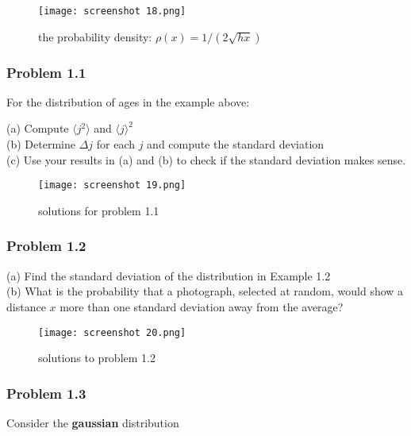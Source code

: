 \documentclass[svgnames]{article}   	%
\begin{document}
\begin{figure}[htb!]
  \centering
    \texttt{[image: screenshot 18.png]}
    \caption{the probability density: $\rho(x) = 1/(2\sqrt{hx})$}
\end{figure}


\subsubsection{Problem 1.1} For the distribution of ages in the example above: 

\begin{tcolorbox}	
  
  (a) Compute $\langle j^2 \rangle$ and $\langle j \rangle^2$ \\
  (b) Determine $\Delta j$ for each $j$ and compute the standard deviation\\
  (c) Use your results in (a) and (b) to check if the standard deviation makes sense. 
  
\end{tcolorbox}	


\begin{figure}[htb!]
  \centering
    \texttt{[image: screenshot 19.png]}
    \caption{solutions for problem 1.1}
\end{figure}


\subsubsection{Problem 1.2} 

\begin{tcolorbox}	
  
(a) Find the standard deviation of the distribution in Example 1.2\\
(b) What is the probability that a photograph, selected at random, would show
a distance $x$ more than one standard deviation away from the average?

\end{tcolorbox}	

\begin{figure}[htb!]
  \centering
    \texttt{[image: screenshot 20.png]}
    \caption{solutions to problem 1.2}
\end{figure}

\subsubsection{Problem 1.3} Consider the \textbf{gaussian} distribution 
\end{document}
